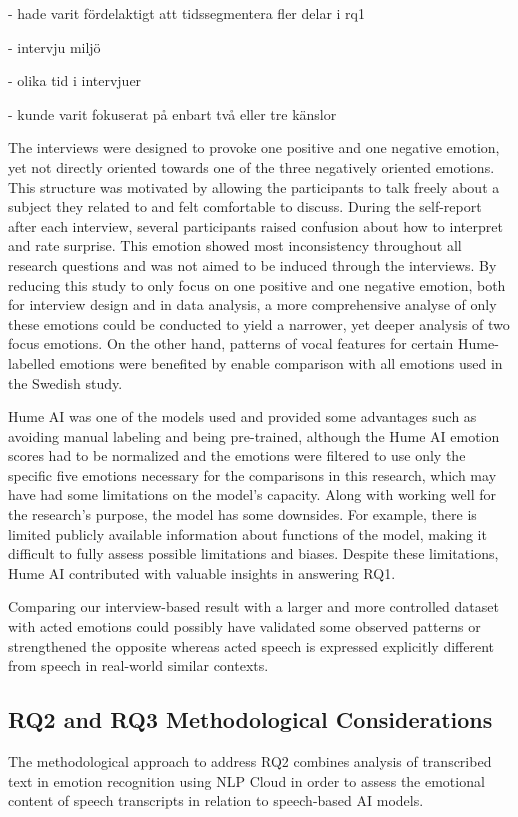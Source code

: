 - hade varit fördelaktigt att tidssegmentera fler delar i rq1 

- intervju miljö 

- olika tid i intervjuer 

- kunde varit fokuserat på enbart två eller tre känslor 


\medskip

The interviews were designed to provoke one positive and one negative emotion, yet not directly oriented towards one of the three negatively oriented emotions. This structure was motivated by allowing the participants to talk freely about a subject they related to and felt comfortable to discuss. During the self-report after each interview, several participants raised confusion about how to interpret and rate surprise. This emotion showed most inconsistency throughout all research questions and was not aimed to be induced through the interviews. By reducing this study to only focus on one positive and one negative emotion, both for interview design and in data analysis, a more comprehensive analyse of only these emotions could be conducted to yield a narrower, yet deeper analysis of two focus emotions. On the other hand, patterns of vocal features for certain Hume-labelled emotions were benefited by enable comparison with all emotions used in the Swedish study. 

Hume AI was one of the models used and provided some advantages such as avoiding manual
labeling and being pre-trained, although the Hume AI emotion scores had to be normalized and
the emotions were filtered to use only the specific five emotions necessary for the comparisons
in this research, which may have had some limitations on the model’s capacity. Along with
working well for the research’s purpose, the model has some downsides. For example, there is
limited publicly available information about functions of the model, making it diﬀicult to fully
assess possible limitations and biases. Despite these limitations, Hume AI contributed with valuable insights in answering RQ1.

Comparing our interview-based result with a larger and more controlled dataset with acted emotions could possibly have validated some observed patterns or strengthened the opposite whereas acted speech is expressed explicitly different from speech in real-world similar contexts. 

\subsection{RQ2 and RQ3 Methodological Considerations}
The methodological approach to address RQ2 combines analysis of transcribed text in emotion recognition using NLP Cloud in order to assess the emotional content of speech transcripts in relation to speech-based AI models.

